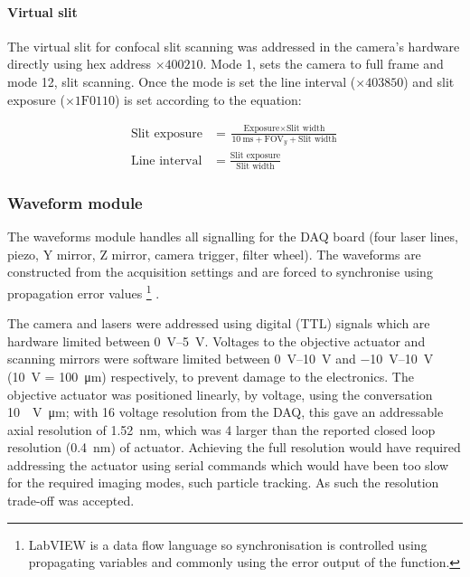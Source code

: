 \paragraph{Virtual slit}

The virtual slit for confocal slit scanning was addressed in the camera's hardware directly using hex address \(\times 400210\).
Mode 1, sets the camera to full frame and mode 12, slit scanning.
Once the mode is set the line interval (\(\times 403850\)) and slit exposure (\(\times \text{1F0110}\)) is set according to the equation:

\begin{align}
    \text{Slit exposure} &= \frac{\text{Exposure} \times \text{Slit width}}{\SI{10}{\milli\second} + \text{FOV}_y + \text{Slit width}} \\
    \text{Line interval} &= \frac{\text{Slit exposure}}{\text{Slit width}}
\end{align}

\subsubsection{Waveform module}

The waveforms module handles all signalling for the \gls{DAQ} board (four laser lines, piezo, Y mirror, Z mirror, camera trigger, filter wheel).
The waveforms are constructed from the acquisition settings %
and are forced to synchronise using propagation error values
\footnote{\gls{LabVIEW} is a data flow language so synchronisation is controlled using propagating variables and commonly using the error output of the function.}
.

The camera and lasers were addressed using digital (\gls{TTL}) signals which are hardware limited between \SIrange{0}{5}{\volt}.
Voltages to the objective actuator and scanning mirrors were software limited between \SIrange{0}{10}{\volt} and \SIrange{-10}{10}{\volt} (\SI{10}{\volt} = \SI{100}{\micro\meter}) respectively, to prevent damage to the electronics.
The objective actuator was positioned linearly, by voltage, using the conversation \SI{10}{\per\volt\micro\meter}; with \SI{16}{\bit} voltage resolution from the \gls{DAQ}, this gave an addressable axial resolution of \SI{1.52}{\nano\meter}, which was \SI{4}{\times} larger than the reported closed loop resolution (\SI{0.4}{\nano\meter}) of actuator.
Achieving the full resolution would have required addressing the actuator using serial commands which would have been too slow for the required imaging modes, such particle tracking.
As such the resolution trade-off was accepted.


